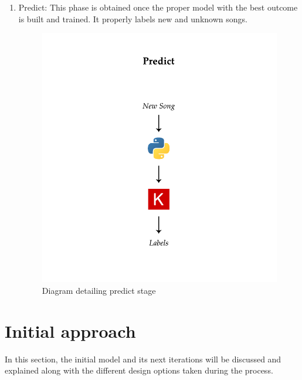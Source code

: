 \begin{itemize}
\begin{enumerate}
        \item Predict: This phase is obtained once the proper model with the best outcome is built and trained. It properly labels new and unknown songs.
        \begin{figure}[th]
            \centering
            \includegraphics{Figures/PredictStage}
            \decoRule
            \caption[Predict stage]{Diagram detailing predict stage}
            \label{fig:Predict Stage}
        \end{figure}

    \end{enumerate}

\end{itemize}

\newpage

\section{Initial approach}
\label{initialapproach}

In this section, the initial model and its next iterations will be discussed and explained along with the different design options taken during the process.

